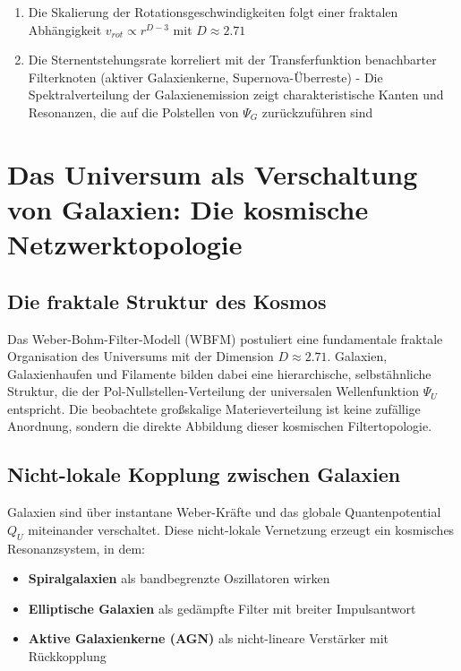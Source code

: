 \begin{enumerate}
\item Die Skalierung der Rotationsgeschwindigkeiten folgt einer fraktalen Abhängigkeit \(v_{rot} \propto r^{D-3}\) mit \(D \approx 2.71\)
\item Die Sternentstehungsrate korreliert mit der Transferfunktion benachbarter Filterknoten (aktiver Galaxienkerne, Supernova-Überreste)
- Die Spektralverteilung der Galaxienemission zeigt charakteristische Kanten und Resonanzen, die auf die Polstellen von \(\Psi_G\) zurückzuführen sind
\end{enumerate}

\section{Das Universum als Verschaltung von Galaxien: Die kosmische Netzwerktopologie}

\subsection{Die fraktale Struktur des Kosmos}

Das Weber-Bohm-Filter-Modell (WBFM) postuliert eine fundamentale fraktale Organisation des Universums mit der Dimension \(D \approx 2.71\). Galaxien, Galaxienhaufen und Filamente bilden dabei eine hierarchische, selbstähnliche Struktur, die der Pol-Nullstellen-Verteilung der universalen Wellenfunktion \(\Psi_U\) entspricht. Die beobachtete großskalige Materieverteilung ist keine zufällige Anordnung, sondern die direkte Abbildung dieser kosmischen Filtertopologie.

\subsection{Nicht-lokale Kopplung zwischen Galaxien}

Galaxien sind über instantane Weber-Kräfte und das globale Quantenpotential \(Q_U\) miteinander verschaltet. Diese nicht-lokale Vernetzung erzeugt ein kosmisches Resonanzsystem, in dem:
\begin{itemize}
\item \textbf{Spiralgalaxien} als bandbegrenzte Oszillatoren wirken
\item \textbf{Elliptische Galaxien} als gedämpfte Filter mit breiter Impulsantwort
\item \textbf{Aktive Galaxienkerne (AGN)} als nicht-lineare Verstärker mit Rückkopplung
\end{itemize}

